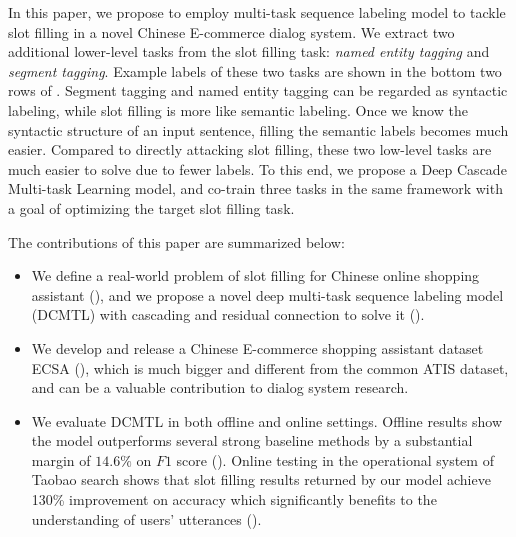 In this paper, we propose to employ multi-task sequence labeling model
to tackle slot filling in a novel Chinese E-commerce dialog system.
We extract two additional lower-level tasks from the slot filling task: 
{\em named entity tagging} and {\em segment tagging}.
Example labels of these two tasks 
are shown in the bottom two rows of .
Segment tagging and named entity tagging can be regarded as 
syntactic labeling, 
while slot filling is more like semantic labeling.
Once we know the syntactic structure of an input sentence,
filling the semantic labels becomes much easier.
Compared to directly attacking slot filling,
these two low-level tasks are much easier to solve
due to fewer labels.
To this end, we propose a Deep Cascade Multi-task Learning model,
and co-train three tasks in the same framework
with a goal of optimizing the target slot filling task.

The contributions of this paper are summarized below:
\begin{itemize}
	\item We define a real-world problem of 
	slot filling for Chinese online shopping assistant 
	(), and we propose a novel deep multi-task 
	sequence labeling model (DCMTL) with cascading and 
	residual connection to solve it ().
	\item We develop and release a Chinese E-commerce shopping assistant dataset 
	ECSA (), which is much bigger and different from 
	the common ATIS dataset, and can be a valuable contribution to 
	dialog system research.  
	\item We evaluate DCMTL in both offline and online settings.
	Offline results show the model outperforms 
	several strong baseline methods by a substantial margin of $14.6\%$ on $F1$ score ().
	Online testing in the operational system of Taobao search shows that 
	slot filling results returned by our model achieve 130\% improvement 
	on accuracy which significantly benefits to the understanding of users' utterances (). 
\end{itemize}

